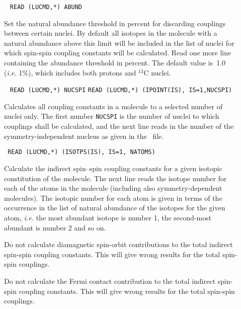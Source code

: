\begin{description}
\item[]\verb| |\newline
\verb|READ (LUCMD,*) ABUND|

Set the natural abundance threshold in percent
for discarding couplings between certain nuclei.
By default all isotopes in the molecule with a natural
abundance above this limit will be included in the list of nuclei for which
spin-spin coupling constants will be calculated. Read one more line
containing the abundance threshold in percent. The default value is~1.0 ({\it i.e.\/} 1\%),
which includes both protons and $^{13}$C nuclei.

\item[]\verb| |\newline
\verb|READ (LUCMD,*) NUCSPI|\newline
\verb|READ (LUCMD,*) (IPOINT(IS), IS=1,NUCSPI)|

Calculates all coupling constants in a molecule to a selected number
of nuclei only. The first number \verb|NUCSPI| is the number of nuclei
to which couplings shall be calculated, and the next line reads in
the number of the symmetry-independent nucleus as given in the
\molinp\ file.

\item[]\verb| |\newline
\verb|READ (LUCMD,*) (ISOTPS(IS), IS=1, NATOMS)|

Calculate the indirect spin--spin coupling constants for a given
isotopic constitution of the molecule. The next line reads the isotope
number for each of the atoms in the molecule (including also
symmetry-dependent molecules). The isotopic number for each atom is
given in terms of the occurrence in the list of natural abundance of
the isotopes for the given atom, {\it i.e.\/} the most abundant
isotope is number 1, the second-most abundant is number 2 and so on.

\item[] Do not calculate diamagnetic
spin-orbit
contributions to the total indirect spin-spin
coupling constants. This
will give wrong results for the total spin-spin couplings.

\item[] Do not calculate the Fermi
contact contribution
to the total indirect spin-spin coupling
constants. This will give
wrong results for the total spin-spin couplings.


\end{description}
